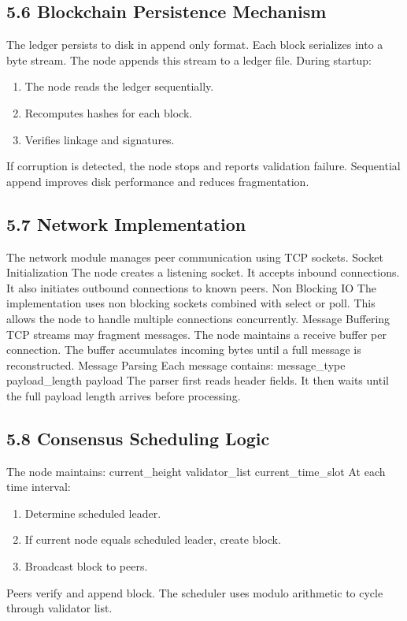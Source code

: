 \subsection*{5.6 Blockchain Persistence Mechanism}
The ledger persists to disk in append only format.
Each block serializes into a byte stream. The node appends this stream to a ledger file.
During startup:
\begin{enumerate}
\item The node reads the ledger sequentially.
\item Recomputes hashes for each block.
\item Verifies linkage and signatures.
\end{enumerate}
If corruption is detected, the node stops and reports validation failure.
Sequential append improves disk performance and reduces fragmentation.

\subsection*{5.7 Network Implementation}
The network module manages peer communication using TCP sockets.
Socket Initialization
The node creates a listening socket. It accepts inbound connections. It also initiates outbound connections to known peers.
Non Blocking IO
The implementation uses non blocking sockets combined with select or poll. This allows the node to handle multiple connections concurrently.
Message Buffering
TCP streams may fragment messages. The node maintains a receive buffer per connection. The buffer accumulates incoming bytes until a full message is reconstructed.
Message Parsing
Each message contains:
message_type
payload_length
payload
The parser first reads header fields. It then waits until the full payload length arrives before processing.

\subsection*{5.8 Consensus Scheduling Logic}
The node maintains:
current_height
validator_list
current_time_slot
At each time interval:
\begin{enumerate}
\item Determine scheduled leader.
\item If current node equals scheduled leader, create block.
\item Broadcast block to peers.
\end{enumerate}
Peers verify and append block.
The scheduler uses modulo arithmetic to cycle through validator list.

